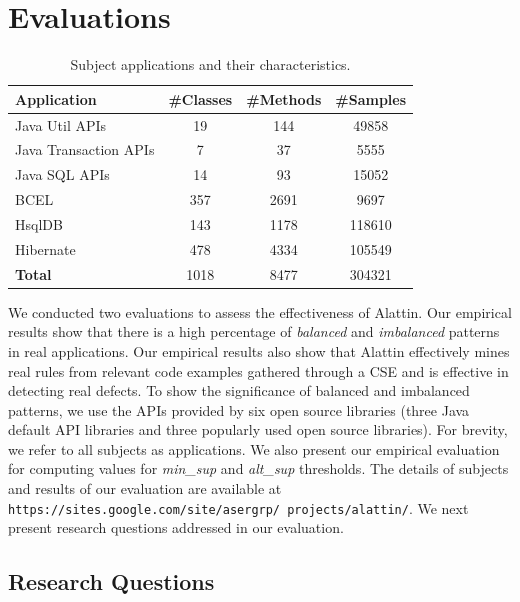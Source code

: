 \section{Evaluations}
\label{sec:eval}

\setlength{\tabcolsep}{1pt}
\begin{table}[t]
\begin{CodeOut}
\begin{center}
\centering \caption {\label{tab:subjects} Subject applications and their characteristics.}
\begin {tabular} {|l|c|c|c|}
\hline
Application&\#Classes&\#Methods&\#Samples\\
\hline Java Util APIs&19&144&49858\\
\hline Java Transaction APIs&7&37&5555\\
\hline Java SQL APIs& 14 & 93 & 15052\\
\hline BCEL & 357 & 2691 & 9697\\
\hline HsqlDB& 143 & 1178 & 118610 \\
\hline Hibernate& 478 & 4334 & 105549 \\
\hline \textbf{Total}& 1018 & 8477 & 304321 \\
\hline
\end{tabular}\vspace*{-3ex}
\end{center}
\end{CodeOut}
\end{table}

We conducted two evaluations to assess the effectiveness of Alattin. Our empirical results show that there is a high percentage of \emph{balanced} and \emph{imbalanced} patterns in real applications. Our empirical results also show that Alattin effectively mines real rules from relevant code examples gathered through a CSE and is effective in detecting real defects. To show the significance of balanced and imbalanced patterns, we use the APIs provided by six open source libraries (three Java default API libraries and three popularly used open source libraries). For brevity, we refer to all subjects as applications. We also present our empirical evaluation for computing values for \emph{min\_sup} and \emph{alt\_sup} thresholds. The details of subjects and results of our evaluation are available at \texttt{https://sites.google.com/site/asergrp/ projects/alattin/}. We next present research questions addressed in our evaluation.
\subsection{Research Questions}

